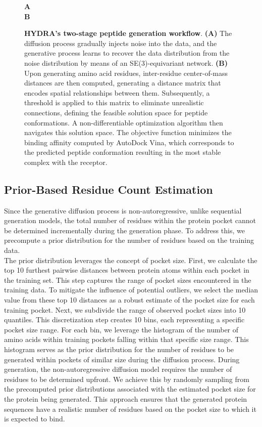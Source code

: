 \begin{figure}
  \center

  \textbf{\Large A}
   \\

  \textbf{\Large B}

  \caption{\textbf{HYDRA's two-stage peptide generation workflow}. \textbf{(A)} The diffusion process gradually injects noise into the data, and the generative process learns to recover the data distribution from the noise distribution by means of an SE(3)-equivariant network. \textbf{(B)} Upon generating amino acid residues, inter-residue center-of-mass distances are then computed, generating a distance matrix that encodes spatial relationships between them. Subsequently, a threshold is applied to this matrix to eliminate unrealistic connections, defining the feasible solution space for peptide conformations. A non-differentiable optimization algorithm then navigates this solution space. The objective function minimizes the binding affinity computed by AutoDock Vina, which corresponds to the predicted peptide conformation resulting in the most stable complex with the receptor.}

  \label{fig:overall_figure}
\end{figure}

\subsection{Prior-Based Residue Count Estimation}
Since the generative diffusion process is non-autoregressive, unlike sequential generation models, the total number of residues within the protein pocket cannot be determined incrementally during the generation phase. To address this, we precompute a prior distribution for the number of residues based on the training data. \\

The prior distribution leverages the concept of pocket size. First, we calculate the top 10 furthest pairwise distances between protein atoms within each pocket in the training set. This step captures the range of pocket sizes encountered in the training data. To mitigate the influence of potential outliers, we select the median value from these top 10 distances as a robust estimate of the pocket size for each training pocket. Next, we subdivide the range of observed pocket sizes into 10 quantiles. This discretization step creates 10 bins, each representing a specific pocket size range. For each bin, we leverage the histogram of the number of amino acids within training pockets falling within that specific size range. This histogram serves as the prior distribution for the number of residues to be generated within pockets of similar size during the diffusion process. During generation, the non-autoregressive diffusion model requires the number of residues to be determined upfront.  We achieve this by randomly sampling from the precomputed prior distributions associated with the estimated pocket size for the protein being generated. This approach ensures that the generated protein sequences have a realistic number of residues based on the pocket size to which it is expected to bind.

